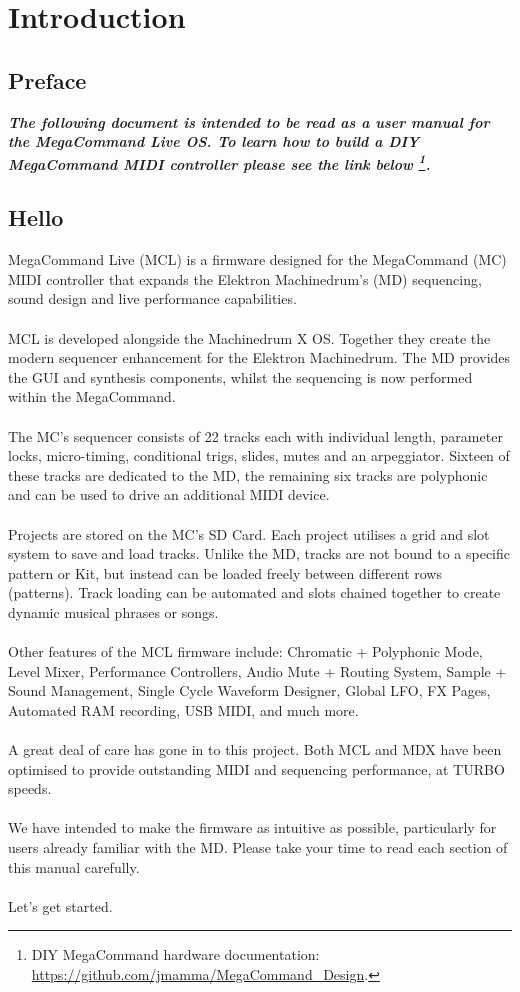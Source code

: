 \chapter{Introduction}
\section{Preface}
\begin{small}
\textbf{\textit{The following document is intended to be read as a user manual for the MegaCommand Live OS. To learn how to build a DIY MegaCommand MIDI controller please see the link below \footnote{DIY MegaCommand hardware documentation: \url{https://github.com/jmamma/MegaCommand_Design}.}.}}

\end{small}

\section{Hello}
MegaCommand Live (MCL) is a firmware designed for the MegaCommand (MC) MIDI controller that expands the Elektron Machinedrum's (MD) sequencing, sound design and live performance capabilities. 
\\
\\
MCL is developed alongside the Machinedrum X OS. Together they create the modern sequencer enhancement for the Elektron Machinedrum. The MD provides the GUI and synthesis components, whilst the sequencing is now performed within the MegaCommand.
\\
\\
The MC's sequencer consists of 22 tracks each with individual length, parameter locks, micro-timing, conditional trigs, slides, mutes and an arpeggiator. Sixteen of these tracks are dedicated to the MD, the remaining six tracks are polyphonic and can be used to drive an additional MIDI device.
\\
\\
Projects are stored on the MC's SD Card. Each project utilises a grid and slot system to save and load tracks. Unlike the MD, tracks are not bound to a specific pattern or Kit, but instead can be loaded freely between different rows (patterns). Track loading can be automated and slots chained together to create dynamic musical phrases or songs. 
\\
\\
Other features of the MCL firmware include: Chromatic + Polyphonic Mode,  Level Mixer, Performance Controllers, Audio Mute + Routing System,  Sample + Sound Management, Single Cycle Waveform Designer, Global LFO, FX Pages, Automated RAM recording, USB MIDI, and much more.
\\
\\
A great deal of care has gone in to this project. Both MCL and MDX have been optimised to provide outstanding MIDI and sequencing performance, at TURBO speeds.
\\
\\
We have intended to make the firmware as intuitive as possible, particularly for users already familiar with the MD. Please take your time to read each section of this manual carefully. 
\\
\\
Let's get started.